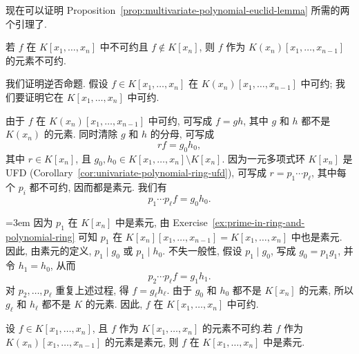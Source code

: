 现在可以证明 Proposition~\ref{prop:multivariate-polynomial-euclid-lemma} 所需的两个引理了.

\begin{Lemma}\label{lem:irreducible-over-fraction-field}
  若 $f$ 在 $K[x_{1},\ldots,x_{n}]$ 中不可约且 $f\notin K[x_{n}]$, 则 $f$ 作为 $K(x_{n})[x_{1},\ldots,x_{n-1}]$ 的元素不可约.
\end{Lemma}

\begin{Proof}
  我们证明逆否命题. 假设 $f\in K[x_{1},\ldots,x_{n}]$ 在 $K(x_{n})[x_{1},\ldots,x_{n-1}]$ 中可约; 我们要证明它在 $K[x_{1},\ldots,x_{n}]$ 中可约.

  由于 $f$ 在 $K(x_{n})[x_{1},\ldots,x_{n-1}]$ 中可约, 可写成 $f=gh$, 其中 $g$ 和 $h$ 都不是 $K(x_{n})$ 的元素. 同时清除 $g$ 和 $h$ 的分母, 可写成
  \[
    rf=g_{0}h_{0},
  \]
  其中 $r\in K[x_{n}]$, 且 $g_{0},h_{0}\in K[x_{1},\ldots,x_{n}]\setminus K[x_{n}]$. 因为一元多项式环 $K[x_{n}]$ 是 UFD (Corollary~\ref{cor:univariate-polynomial-ring-ufd}), 可写成 $r=p_{1}\cdots p_{\ell}$, 其中每个 $p_{i}$ 都不可约, 因而都是素元. 我们有
  \[
    p_{1}\cdots p_{\ell}f=g_{0}h_{0}.
  \]

  \begingroup\emergencystretch=3em
  因为 $p_{1}$ 在 $K[x_{n}]$ 中是素元, 由 Exercise~\ref{ex:prime-in-ring-and-polynomial-ring} 可知 $p_{1}$ 在 $K[x_{n}][x_{1},\ldots,x_{n-1}]=K[x_{1},\ldots,x_{n}]$ 中也是素元. 因此, 由素元的定义, $p_{1}\mid g_{0}$ 或 $p_{1}\mid h_{0}$. 不失一般性, 假设 $p_{1}\mid g_{0}$, 写成 $g_{0}=p_{1}g_{1}$, 并令 $h_{1}=h_{0}$, 从而
  \[
    p_{2}\cdots p_{\ell}f=g_{1}h_{1}.
  \]
  对 $p_{2},\ldots,p_{\ell}$ 重复上述过程, 得 $f=g_{\ell}h_{\ell}$. 由于 $g_{0}$ 和 $h_{0}$ 都不是 $K[x_{n}]$ 的元素, 所以 $g_{\ell}$ 和 $h_{\ell}$ 都不是 $K$ 的元素. 因此, $f$ 在 $K[x_{1},\ldots,x_{n}]$ 中可约.
  \par\endgroup
\end{Proof}

\begin{Lemma}\label{lem:prime-descends-from-fraction-field}
  设 $f\in K[x_{1},\ldots,x_{n}]$, 且 $f$ 作为 $K[x_{1},\ldots,x_{n}]$ 的元素不可约.\linebreak[4]
  若 $f$ 作为 $K(x_{n})[x_{1},\ldots,x_{n-1}]$ 的元素是素元, 则 $f$ 在 $K[x_{1},\ldots,x_{n}]$ 中是素元.
\end{Lemma}

